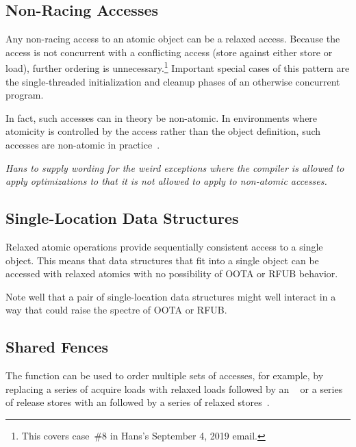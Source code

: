 \documentclass[10]{article}
\begin{document}
\subsection{Non-Racing Accesses}
\label{sec:Non-Racing Accesses}

Any non-racing access to an atomic object can be a relaxed access.
Because the access is not concurrent with a conflicting access (store
against either store or load), further ordering is unnecessary.\footnote{
	This covers case~\#8 in Hans's September 4, 2019 email.}
Important special cases of this pattern are the single-threaded
initialization and cleanup phases of an otherwise concurrent program.

In fact, such accesses can in theory be non-atomic.
In environments where atomicity is controlled by the access rather
than the object definition, such accesses are non-atomic in
practice~\cite{JadeAlglave2019WhoAfraidCompiler}.

\emph{Hans to supply wording for the weird exceptions where the compiler
is allowed to apply optimizations to  that it
is not allowed to apply to non-atomic accesses.}

\subsection{Single-Location Data Structures}
\label{sec:Single-Location Data Structures}

Relaxed atomic operations provide sequentially consistent access to
a single object.
This means that data structures that fit into a single object can
be accessed with relaxed atomics with no possibility of OOTA or
RFUB behavior.

Note well that a pair of single-location data structures might well
interact in a way that could raise the spectre of OOTA or RFUB.

\subsection{Shared Fences}
\label{sec:Shared Fences}

The  function can be used to order
multiple sets of accesses, for example, by replacing a series of
acquire loads with relaxed loads followed by an
~\cite[Section 4.1]{RaulSilvera2007WeakMemoryModel}
or a series of release stores with an
 followed by
a series of relaxed stores~\cite[Section 4.2]{RaulSilvera2007WeakMemoryModel}.
\end{document}
